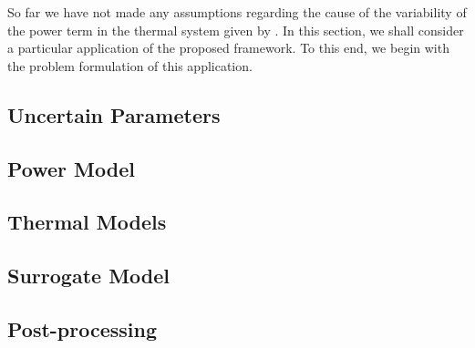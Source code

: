 So far we have not made any assumptions regarding the cause of the variability of the power term in the thermal system given by .
In this section, we shall consider a particular application of the proposed framework.
To this end, we begin with the problem formulation of this application.



\subsection{Uncertain Parameters} 


\subsection{Power Model} 



\subsection{Thermal Models} 


\subsection{Surrogate Model} 


\subsection{Post-processing} 


